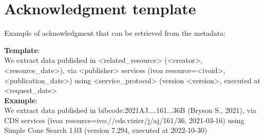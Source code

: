 \documentclass[11pt,a4paper]{ivoa}
\begin{document}
%

\section{Acknowledgment template}
\label{sect:template}

Example of acknowledgment that can be retrieved from the metadata:

\textbf{Template}:\\
We extract data published in <related\_resource> (<creator>, <resource\_date>),
via <publisher> services (ivoa resource=<ivoid>, <publication\_date>)
using <service\_protocol> (version <version>, executed at <request\_date>\\


\textbf{Example}:\\
We extract data published in bibcode:2021AJ....161...36B (Bryson S., 2021),
via CDS services (ivoa resource=ivo://cds.vizier/j/aj/161/36, 2021-03-16)
using Simple Cone Search 1.03 (version 7.294, executed at 2022-10-30)



\appendix
\end{document}
